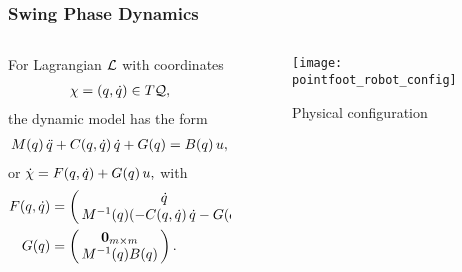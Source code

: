 \begin{frame}[t]

  \frametitle{Swing Phase Dynamics}
  \begin{columns}
    \begin{column}{.55\textwidth}
      For Lagrangian $\mathcal{L}$ with coordinates
      \begin{align*}
        \chi = (q, \dot q) \in T\mathcal{Q},
      \end{align*}
      the dynamic model has the form
      \begin{align*}
        M(q) \, \ddot q + C(q, \dot q) \, \dot q + G(q) = B(q) \, u,
      \end{align*}
      or ${\dot {\chi}} = F(q, \dot q)+ G(q) \, u,$ with
      \begin{align*}
        \xf\argsqdq &= \left(\!\!\begin{array}{c}
            \dq\\
            \M^{-1}\argsq (-\C\argsqdq \, \dq - \G\argsq)
          \end{array}\!\!\right),\\
        \xg(\q) &= \left(\!\!\begin{array}{c}
            \mathbf{0}_{m \times m}\\
            \M^{-1}(\q) \B(\q)
          \end{array}\!\!\right).
      \end{align*}
    \end{column}\!\!
    \begin{column}{.45\textwidth}
      \begin{figure}
        \centering
        \vspace{-10mm}
        \caption{Physical configuration}
        \texttt{[image: pointfoot\_robot\_config]}
      \end{figure}
    \end{column}
  \end{columns}
\end{frame}

